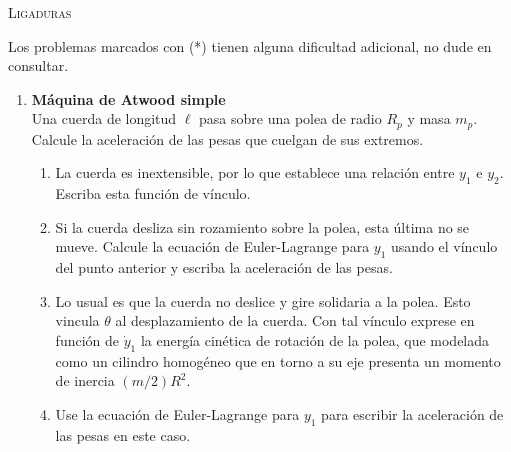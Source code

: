\documentclass[11pt, spanish, a4paper, twoside]{article}
\begin{document}
\begin{center}
  \textsc{\large Ligaduras}
\end{center}

\noindent
Los problemas marcados con (*) tienen alguna dificultad adicional, no dude en consultar.

\begin{enumerate}

\item 
	\begin{minipage}[t][3cm]{0.72\textwidth}
		\textbf{Máquina de Atwood simple}\\
		Una cuerda de longitud \(\ell\) pasa sobre una polea de radio \(R_p\) y masa \(m_p\).
		Calcule la aceleración de las pesas que cuelgan de sus extremos.
	\end{minipage}
	\begin{minipage}[c][3cm][t]{0.2\textwidth}
		
	\end{minipage}
		\begin{enumerate}
			\item La cuerda es inextensible, por lo que establece una relación entre \(y_1\) e \(y_2\).
			Escriba esta función de vínculo.
			\item Si la cuerda desliza sin rozamiento sobre la polea, esta última no se mueve.
			Calcule la ecuación de Euler-Lagrange para \(y_1\) usando el vínculo del punto anterior y escriba la aceleración de las pesas.
			\item Lo usual es que la cuerda no deslice y gire solidaria a la polea.
			Esto vincula \(\theta\) al desplazamiento de la cuerda.
			Con tal vínculo exprese en función de \(\dot{y}_1\) la energía cinética de rotación de la polea, que modelada como un cilindro homogéneo que en torno a su eje presenta un momento de inercia \((m/2) R^2\).
			\item Use la ecuación de Euler-Lagrange para \(y_1\) para escribir la aceleración de las pesas en este caso.
		\end{enumerate}
	

\end{enumerate}
\end{document}

